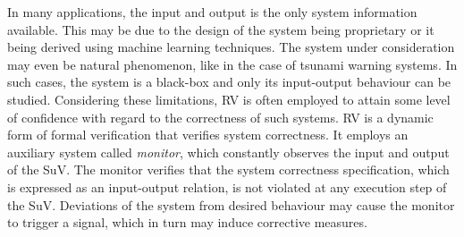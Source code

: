 In many applications, the input and output is the only system
information available.
This may be due to the design of the system being proprietary or it
being derived using machine learning techniques.
The system under consideration may even be natural phenomenon, like in
the case of tsunami warning systems.
%
In such cases, the system is a black-box and only its input-output
behaviour can be studied.
Considering these limitations, \gls{RV} is often employed to attain
some level of confidence with regard to the correctness of such
systems.
\gls{RV} is a dynamic form of formal verification that verifies system
correctness.
It employs an auxiliary system called \emph{monitor}, which constantly
observes the input and output of the \gls{SuV}.
The monitor verifies that the system correctness specification, which
is expressed as an input-output relation, is not violated at any
execution step of the \gls{SuV}.
Deviations of the system from desired behaviour may cause the monitor
to trigger a signal, which in turn may induce corrective measures.
%
%
